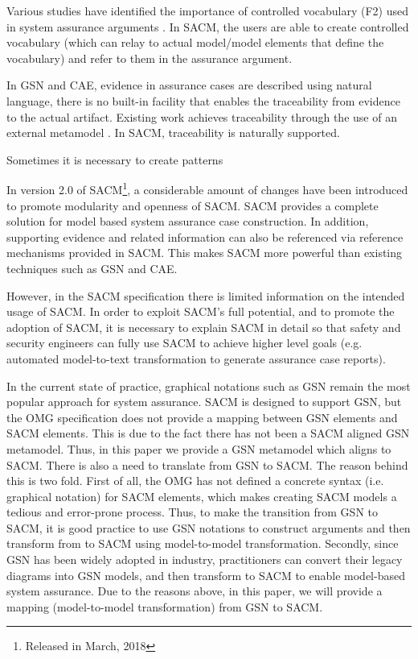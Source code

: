 Various studies have identified the importance of controlled vocabulary (F2) used in system assurance arguments \cite{luo2015safety, attwood2014use}. 
In SACM, the users are able to create controlled vocabulary (which can relay to actual model/model elements that define the vocabulary) and refer to them in the assurance argument. 

In GSN and CAE, evidence in assurance cases are described using natural language, there is no built-in facility that enables the traceability from evidence to the actual artifact. 
Existing work achieves traceability through the use of an external metamodel \cite{taguchi2014linking}.
In SACM, traceability is naturally supported.

Sometimes it is necessary to create patterns 


In version 2.0 of SACM\footnote{Released in March, 2018}, a considerable amount of changes have been introduced to promote modularity and openness of SACM. 
SACM provides a complete solution for model based system assurance case construction. 
In addition, supporting evidence and related information can also be referenced via reference mechanisms provided in SACM. 
This makes SACM more powerful than existing techniques such as GSN and CAE.

However, in the SACM specification there is limited information on the intended usage of SACM. 
In order to exploit SACM's full potential, and to promote the adoption of SACM, it is necessary to explain SACM in detail so that safety and security engineers can fully use SACM to achieve higher level goals (e.g. automated model-to-text transformation to generate assurance case reports). 

In the current state of practice, graphical notations such as GSN remain the most popular approach for system assurance. 
SACM is designed to support GSN, but the OMG specification does not provide a mapping between GSN elements and SACM elements. 
This is due to the fact there has not been a SACM aligned GSN metamodel. 
Thus, in this paper we provide a GSN metamodel which aligns to SACM. 
There is also a need to translate from GSN to SACM. 
The reason behind this is two fold. First of all, the OMG has not defined a concrete syntax (i.e. graphical notation) for SACM elements, which makes creating SACM models a tedious and error-prone process. 
Thus, to make the transition from GSN to SACM, it is good practice to use GSN notations to construct arguments and then transform from to SACM using model-to-model transformation. Secondly, since GSN has been widely adopted in industry, practitioners can convert their legacy diagrams into GSN models, and then transform to SACM to enable model-based system assurance. 
Due to the reasons above, in this paper, we will provide a mapping (model-to-model transformation) from GSN to SACM.

